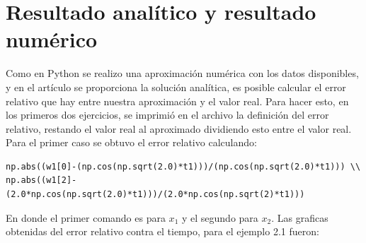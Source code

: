 \documentclass[12pt]{article}
\begin{document}
\section{Resultado analítico y resultado numérico}
Como en Python se realizo una aproximación numérica con los datos disponibles, y en el artículo se proporciona la solución analítica, es posible calcular el error relativo que hay entre nuestra aproximación y el valor real. Para hacer esto, en los primeros dos ejercicios, se imprimió en el archivo la definición del error relativo, restando el valor real al aproximado dividiendo esto entre el valor real. \\

Para el primer caso se obtuvo el error relativo calculando:

\begin{verbatim}
np.abs((w1[0]-(np.cos(np.sqrt(2.0)*t1)))/(np.cos(np.sqrt(2.0)*t1))) \\
np.abs((w1[2]-(2.0*np.cos(np.sqrt(2.0)*t1)))/(2.0*np.cos(np.sqrt(2)*t1)))
\end{verbatim}

En donde el primer comando es para $x_1$ y el segundo para $x_2$. Las graficas obtenidas del error relativo contra el tiempo, para el ejemplo 2.1 fueron:
\end{document}
